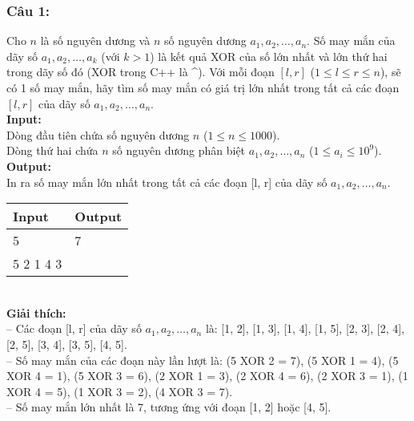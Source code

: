 \subsubsection*{Câu 1: }
Cho $n$ là số nguyên dương và $n$ số nguyên dương $a_1, a_2, \ldots, a_n$. Số may mắn của dãy số $a_1, a_2, \ldots, a_k$ (với $k > 1$) là kết quả XOR của số lớn nhất và lớn thứ hai trong dãy số đó (XOR trong C++ là \textasciicircum{}). Với mỗi đoạn $[l, r]$ ($1 \leq l \leq r \leq n$), sẽ có 1 số may mắn, hãy tìm số may mắn có giá trị lớn nhất trong tất cả các đoạn $[l, r]$ của dãy số $a_1, a_2, \ldots, a_n$.\\
\textbf{Input:}\\
Dòng đầu tiên chứa số nguyên dương $n$ ($1 \leq n \leq 1000$).\\
Dòng thứ hai chứa $n$ số nguyên dương phân biệt $a_1, a_2, \ldots, a_n$ ($1 \leq a_i \leq 10^9$).\\
\textbf{Output:}\\
In ra số may mắn lớn nhất trong tất cả các đoạn [l, r] của dãy số $a_1, a_2, \ldots, a_n$.\\
\begin{table}[h!]
    \centering
    \begin{tabularx}{0.8\textwidth}{|X|X|}
        \hline
        \textbf{Input} & \textbf{Output} \\
        \hline
        5 & 7 \\
        5 2 1 4 3 &  \\
        \hline
    \end{tabularx}
\end{table}\\
\textbf{Giải thích:}\\
-- Các đoạn [l, r] của dãy số $a_1, a_2, \ldots, a_n$ là: [1, 2], [1, 3], [1, 4], [1, 5], [2, 3], [2, 4], [2, 5], [3, 4], [3, 5], [4, 5].\\
-- Số may mắn của các đoạn này lần lượt là: (5 XOR 2 = 7), (5 XOR 1 = 4), (5 XOR 4 = 1), (5 XOR 3 = 6), (2 XOR 1 = 3), (2 XOR 4 = 6), (2 XOR 3 = 1), (1 XOR 4 = 5), (1 XOR 3 = 2), (4 XOR 3 = 7).\\
-- Số may mắn lớn nhất là 7, tương ứng với đoạn [1, 2] hoặc [4, 5].
